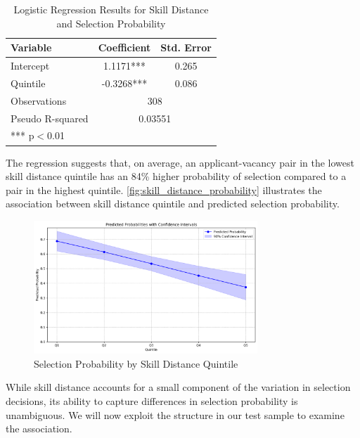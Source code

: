 \begin{table}[h]
    \centering
    \caption{Logistic Regression Results for Skill Distance and Selection Probability}
    \renewcommand{\arraystretch}{1.2} 
    \begin{tabular}{lcc}
    \hline
    \textbf{Variable} & \textbf{Coefficient} & \textbf{Std. Error} \\
    \hline
    Intercept & 1.1171*** & 0.265 \\
    Quintile & -0.3268*** & 0.086 \\
    \hline
    Observations & \multicolumn{2}{c}{308} \\
    Pseudo R-squared & \multicolumn{2}{c}{0.03551} \\
    \hline
    \multicolumn{3}{l}{\footnotesize{*** p$<$0.01}} \\
    \end{tabular}
    \label{tab:logistic_regression}
\end{table}

The regression suggests that, on average, an applicant-vacancy pair in the lowest skill distance quintile has an 84\% higher probability of selection compared to a pair in 
the highest quintile. \autoref{fig:skill_distance_probability} illustrates the association between skill distance quintile and predicted selection probability.


\begin{figure}[h]
    \centering
    \includegraphics[width=0.75\textwidth]{new_img/pp.png}
    \caption{Selection Probability by Skill Distance Quintile}
    \label{fig:skill_distance_probability}
\end{figure}

While skill distance accounts for a small component of the variation in selection decisions, its ability to capture differences in selection probability is unambiguous. 
We will now exploit the structure in our test sample to examine the association. 


